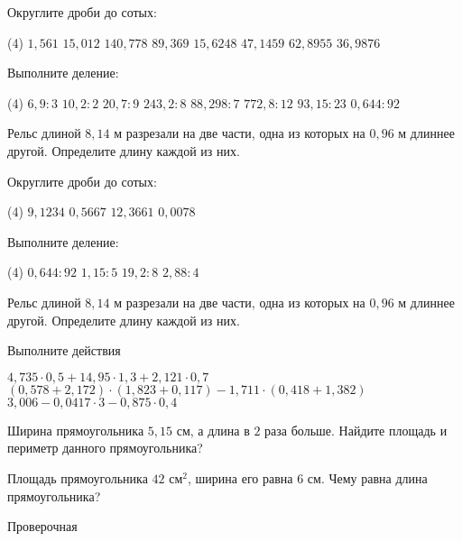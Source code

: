 \begin{class}[number=3]
	\begin{listofex}
		\item Округлите дроби до сотых:
		\begin{tasks}(4)
			\task \( 1,561 \)
			\task \( 15,012 \)
			\task \( 140,778 \)
			\task \( 89,369 \)
			\task \( 15,6248 \)
			\task \( 47,1459 \)
			\task \( 62,8955 \)
			\task \( 36,9876 \)
		\end{tasks}
		\item Выполните деление:
		\begin{tasks}(4)
			\task \( 6,9:3 \)
			\task \( 10,2:2 \)
			\task \( 20,7:9 \)
			\task \( 243,2:8 \)
			\task \( 88,298:7 \)
			\task \( 772,8:12 \)
			\task \( 93,15:23 \)
			\task \( 0,644:92 \)
		\end{tasks}
		\item Рельс длиной \( 8,14 \) м разрезали на две части, одна из которых на \( 0,96 \) м длиннее другой. Определите длину каждой из них.
	\end{listofex}
\end{class}

\begin{homework}[number=3]
	\begin{listofex}
		\item Округлите дроби до сотых:
		\begin{tasks}(4)
			\task \( 9,1234 \)
			\task \( 0,5667 \)
			\task \( 12,3661 \)
			\task \( 0,0078 \)
		\end{tasks}
		\item Выполните деление:
		\begin{tasks}(4)
			\task \( 0,644:92 \)
			\task \( 1,15:5 \)
			\task \( 19,2:8 \)
			\task \( 2,88:4 \)
		\end{tasks}
		\item Рельс длиной \( 8,14 \) м разрезали на две части, одна из которых на \( 0,96 \) м длиннее другой. Определите длину каждой из них.
	\end{listofex}
\end{homework}

\begin{class}[number=4]
	\begin{listofex}
		\item Выполните действия
		\begin{tasks}
			\task \( 4,735\cdot0,5+14,95\cdot1,3+2,121\cdot0,7 \)
			\task \( (0,578+2,172)\cdot(1,823+0,117)-1,711\cdot(0,418+1,382) \)
			\task \( 3,006-0,0417\cdot3-0,875\cdot0,4 \)
		\end{tasks}
		\item Ширина прямоугольника \( 5,15 \) см, а длина в \( 2 \) раза больше. Найдите площадь и периметр данного прямоугольника?
		\item Площадь прямоугольника \( 42 \) см\( ^{2} \), ширина его равна \( 6 \) см. Чему равна длина прямоугольника?
	\end{listofex}
\end{class}


\begin{exam}
	\begin{listofex}
		\item Проверочная
	\end{listofex}
\end{exam}
